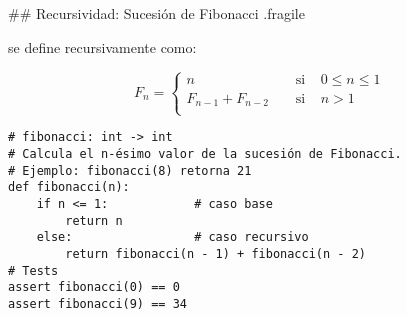 ## Recursividad: Sucesión de Fibonacci {.fragile}

\bgnblocknormal
{} se define recursivamente como:
\trmblocknormal

\vspace{-2ex}

$$ F_n = \begin{cases}
        n                 & \;\;\;\;\text{si} \;\;\;\; 0 \leq n \leq 1 \\
        F_{n-1} + F_{n-2} & \;\;\;\;\text{si} \;\;\;\; n > 1 \\
    \end{cases}
$$

\vspace{1ex}
\begin{lstlisting}[style=frame02]
# fibonacci: int -> int
# Calcula el n-ésimo valor de la sucesión de Fibonacci.
# Ejemplo: fibonacci(8) retorna 21
def fibonacci(n):
    if n <= 1:            # caso base
        return n
    else:                 # caso recursivo
        return fibonacci(n - 1) + fibonacci(n - 2)
# Tests
assert fibonacci(0) == 0
assert fibonacci(9) == 34
\end{lstlisting}

